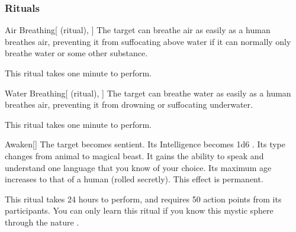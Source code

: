 \subsubsection{Rituals}


\lowercase{\hypertarget{spell:Air Breathing}{}}\label{spell:Air Breathing}
\begin{attuneability}[Rank 3]{\hypertarget{spell:Air Breathing}{Air Breathing}}[ (ritual), ]
The target can breathe air as easily as a human breathes air, preventing it from suffocating above water if it can normally only breathe water or some other substance.

This ritual takes one minute to perform.
\end{attuneability}
\vspace{0.25em}



\lowercase{\hypertarget{spell:Water Breathing}{}}\label{spell:Water Breathing}
\begin{attuneability}[Rank 3]{\hypertarget{spell:Water Breathing}{Water Breathing}}[ (ritual), ]
The target can breathe water as easily as a human breathes air, preventing it from drowning or suffocating underwater.

This ritual takes one minute to perform.
\end{attuneability}
\vspace{0.25em}



\lowercase{\hypertarget{spell:Awaken}{}}\label{spell:Awaken}
\begin{apability}[Rank 6]{\hypertarget{spell:Awaken}{Awaken}}[]
The target becomes sentient.
Its Intelligence becomes 1d6 .
Its type changes from animal to magical beast.
It gains the ability to speak and understand one language that you know of your choice.
Its maximum age increases to that of a human (rolled secretly).
This effect is permanent.

This ritual takes 24 hours to perform, and requires 50 action points from its participants.
You can only learn this ritual if you know this mystic sphere through the nature .
\end{apability}
\vspace{0.25em}


